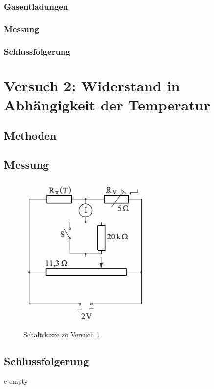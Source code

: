 \documentclass[11pt,a4paper,titlepage, ngerman]{article}
\begin{document}
			\subsubsection{Gasentladungen}
			
					
			\subsubsection{Messung}
			
			
			\subsubsection{Schlussfolgerung}
			
			
	\section{Versuch 2: Widerstand in Abhängigkeit der Temperatur}		

		\subsection{Methoden} %
		
		
		\subsection{Messung}
			
			
		\begin{figure}
			\centering
			\includegraphics[width=0.6\textwidth]{Versuch2.png}
			\caption{Schaltskizze zu Versuch 1}
			\label{Schaltskizze2}
		\end{figure}
		
		\subsection{Schlussfolgerung}	
			
	
	\newpage	
	\begin{thebibliography}	
		e empty
	\end{thebibliography}	
			
\end{document}
